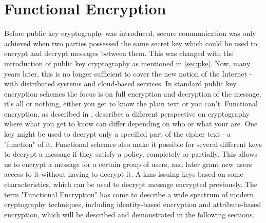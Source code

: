 \section{Functional Encryption}
Before public key cryptography was introduced, secure communication was only achieved when two parties possessed the same secret key which could be used to encrypt and decrypt messages between them. This was changed with the introduction of public key cryptography as mentioned in \ref{sec:pke}. Now, many years later, this is no longer sufficient to cover the new notion of the Internet - with distributed systems and cloud-based services. 
In standard public key encryption schemes the focus is on full encryption and decryption of the message, it's all or nothing, either you get to know the plain text or you can't. Functional encryption, as described in \cite{boneh2012functional}, describes a different perspective on cryptography where what you get to know can differ depending on who or what your are. One key might be used to decrypt only a specified part of the cipher text - a "function" of it. Functional schemes also make it possible for several different keys to decrypt a message if they satisfy a policy, completely or partially. This allows us to encrypt a message for a certain group of users, and later grant new users access to it without having to decrypt it. A \gls{kms} issuing  keys based on some characteristics, which can be used to decrypt message encrypted previously. The term "Functional Encryption" has come to describe a wide spectrum of modern cryptography techniques, including identity-based encryption and attribute-based encryption, which will be described and demonstrated in the following sections.

